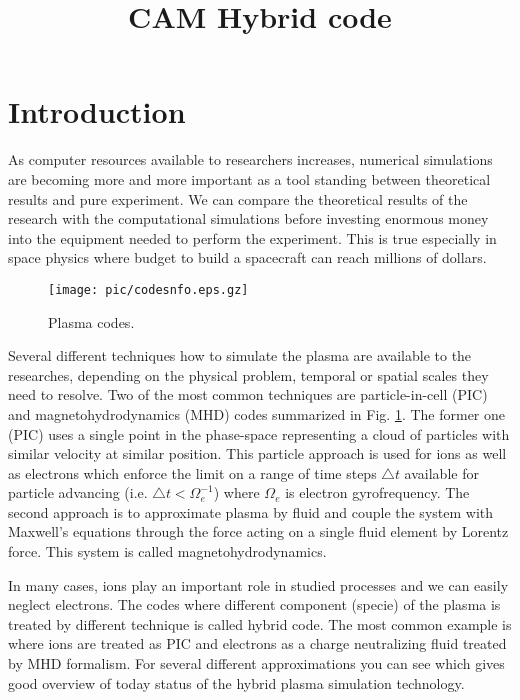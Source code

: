 \documentclass[oneside,branding,toc,article]{sat}
\title{CAM Hybrid code}
\begin{document}
\maketitle

\section{Introduction}

As computer resources available to researchers increases, numerical simulations
are becoming more and more important as a tool standing between theoretical
results and pure experiment.  We can compare the theoretical results of the
research with the computational simulations before investing enormous money
into the equipment needed to perform the experiment.  This is true especially
in space physics where budget to build a spacecraft can reach millions of
dollars.

\begin{figure}[!hbp]
  \centering
  \texttt{[image: pic/codesnfo.eps.gz]}
  \caption{Plasma codes.}
  \label{fig:nfo}
\end{figure}

Several different techniques how to simulate the plasma are available to the
researches, depending on the physical problem, temporal or spatial scales they
need to resolve.  Two of the most common techniques are particle-in-cell (PIC)
and magnetohydrodynamics (MHD) codes summarized in Fig.  \ref{fig:nfo}.  The
former one (PIC) uses a single point in the phase-space representing a cloud of
particles with similar velocity at similar position.  This particle approach is
used for ions as well as electrons which enforce the limit on a range of time
steps $\triangle t$ available for particle advancing (i.e. $\triangle t <
\Omega_e^{-1}$) where $\Omega_e$ is electron gyrofrequency.  The second
approach is to approximate plasma by fluid and couple the system with Maxwell's
equations through the force acting on a single fluid element by Lorentz
force. This system is called magnetohydrodynamics.

In many cases, ions play an important role in studied processes and we can
easily neglect electrons. The codes where different component (specie) of the
plasma is treated by different technique is called hybrid code. The most common
example is where ions are treated as PIC and electrons as a charge neutralizing
fluid treated by MHD formalism.  For several different approximations you can
see \cite{lipatov02} which gives good overview of today status of the hybrid
plasma simulation technology.
\end{document}
